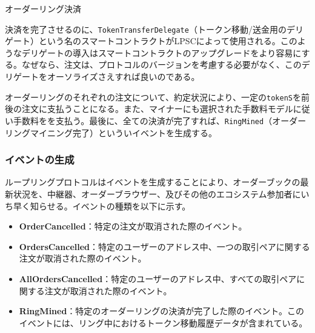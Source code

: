 \documentclass{article}
\makeatletter
\newenvironment{figurehere}
 {\def\@captype{figure}}
 {}
\makeatother
\begin{document}
\begin{multicols}{2}
\begin{center}
\begin{figurehere}
\caption{オーダーリング決済}
\label{fig:settlement}
\end{figurehere}
\end{center}

決済を完了させるのに、\verb|TokenTransferDelegate|（トークン移動/送金用のデリゲート）という名のスマートコントラクトがLPSCによって使用される。このようなデリゲートの導入はスマートコントラクトのアップグレードをより容易にする。なぜなら、注文は、プロトコルのバージョンを考慮する必要がなく、このデリゲートをオーソライズさえすれば良いのである。

オーダーリングのそれぞれの注文について、約定状況により、一定の\verb|tokenS|を前後の注文に支払うことになる。また、マイナーにも選択された手数料モデルに従い手数料をを支払う。最後に、全ての決済が完了すれば、\verb|RingMined|（オーダーリングマイニング完了）といういイベントを生成する。


\subsubsection{イベントの生成\label{sec:events}}

ループリングプロトコルはイベントを生成することにより、オーダーブックの最新状況を、中継器、オーダーブラウザー、及びその他のエコシステム参加者にいち早く知らせる。イベントの種類を以下に示す。

\begin{itemize}
	\item \textbf{OrderCancelled}：特定の注文が取消された際のイベント。
	\item \textbf{OrdersCancelled}：特定のユーザーのアドレス中、一つの取引ペアに関する注文が取消された際のイベント。
	\item \textbf{AllOrdersCancelled}：特定のユーザーのアドレス中、すべての取引ペアに関する注文が取消された際のイベント。
	\item \textbf{RingMined}：特定のオーダーリングの決済が完了した際のイベント。このイベントには、リング中におけるトークン移動履歴データが含まれている。
\end{itemize}



\end{multicols}
\end{document}
